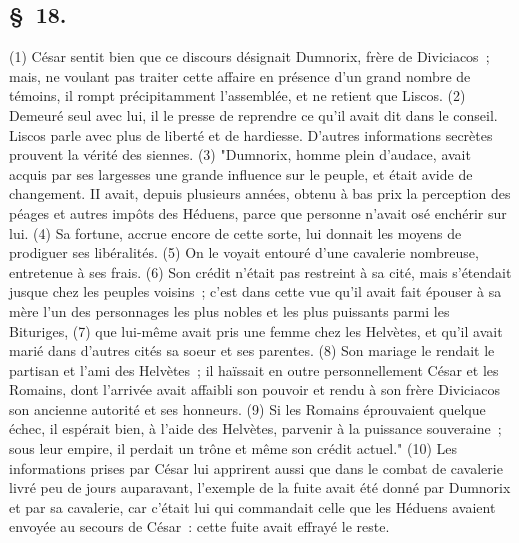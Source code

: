 \documentclass[french,twoside]{book} %
\begin{document}
\subsection[{§ 18.}]{ \textsc{§ 18.} }
\noindent (1) César sentit bien que ce discours désignait Dumnorix, frère de Diviciacos ; mais, ne voulant pas traiter cette affaire en présence d’un grand nombre de témoins, il rompt précipitamment l’assemblée, et ne retient que Liscos. (2) Demeuré seul avec lui, il le presse de reprendre ce qu’il avait dit dans le conseil. Liscos parle avec plus de liberté et de hardiesse. D'autres informations secrètes prouvent la vérité des siennes. (3) "Dumnorix, homme plein d’audace, avait acquis par ses largesses une grande influence sur le peuple, et était avide de changement. II avait, depuis plusieurs années, obtenu à bas prix la perception des péages et autres impôts des Héduens, parce que personne n’avait osé enchérir sur lui. (4) Sa fortune, accrue encore de cette sorte, lui donnait les moyens de prodiguer ses libéralités. (5) On le voyait entouré d’une cavalerie nombreuse, entretenue à ses frais. (6) Son crédit n’était pas restreint à sa cité, mais s’étendait jusque chez les peuples voisins ; c’est dans cette vue qu’il avait fait épouser à sa mère l’un des personnages les plus nobles et les plus puissants parmi les Bituriges, (7) que lui-même avait pris une femme chez les Helvètes, et qu’il avait marié dans d’autres cités sa soeur et ses parentes. (8) Son mariage le rendait le partisan et l’ami des Helvètes ; il haïssait en outre personnellement César et les Romains, dont l’arrivée avait affaibli son pouvoir et rendu à son frère Diviciacos son ancienne autorité et ses honneurs. (9) Si les Romains éprouvaient quelque échec, il espérait bien, à l’aide des Helvètes, parvenir à la puissance souveraine ; sous leur empire, il perdait un trône et même son crédit actuel." (10) Les informations prises par César lui apprirent aussi que dans le combat de cavalerie livré peu de jours auparavant, l’exemple de la fuite avait été donné par Dumnorix et par sa cavalerie, car c’était lui qui commandait celle que les Héduens avaient envoyée au secours de César : cette fuite avait effrayé le reste.
\end{document}
